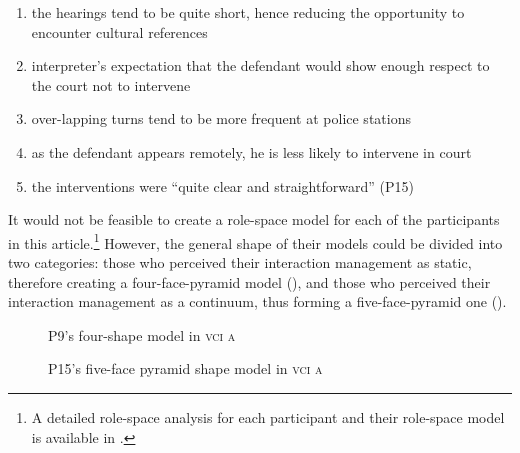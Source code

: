 \documentclass[output=paper]{langsci/langscibook}
\begin{document}
\begin{enumerate}
\item the hearings tend to be quite short, hence reducing the opportunity to encounter cultural references 
\item interpreter’s expectation that the defendant would show enough respect to the court not to intervene 
\item over-lapping turns tend to be more frequent at police stations 
\item as the defendant appears remotely, he is less likely to intervene in court 
\item the interventions were “quite clear and straightforward” (P15)
\end{enumerate}

It would not be feasible to create a role-space model for each of the participants in this article.\footnote{A detailed role-space analysis for each participant and their role-space model is available in \citet{Devaux2017b}.} However, the general shape of their models could be divided into two categories: those who perceived their interaction management as static, therefore creating a four-face-pyramid model (), and those who perceived their interaction management as a continuum, thus forming a five-face-pyramid one ().  
 

\begin{figure}[p]
\caption{P9's four-shape model in \textsc{vci a}\label{fig:devaux:3}}
\end{figure}

\begin{figure}[p]
\caption{P15's five-face pyramid shape model in \textsc{vci a}\label{fig:devaux:4}}
\end{figure}
\end{document}
